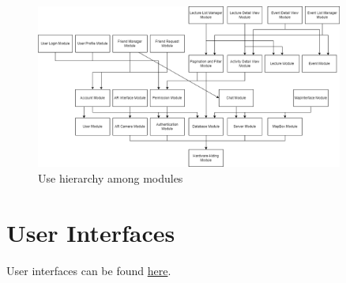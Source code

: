 \documentclass[12pt, titlepage]{article}
\begin{document}
\begin{figure}[H]
\centering
\includegraphics[width=0.9\textwidth]{UsesHierarchy.png}
\caption{Use hierarchy among modules}
\label{FigUH}
\end{figure}

\section{User Interfaces}

User interfaces can be found \href{https://www.figma.com/file/4kCzs4a1iqRLSKAwUbJREh/UI-Feedback?type=design&node-id=0%3A1&mode=design&t=6hfaqfbeFLTKRl9E-1}{here}.
\end{document}

